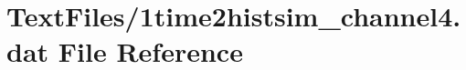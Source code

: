 \hypertarget{1time2histsim__channel4_8dat}{}\section{Text\+Files/1time2histsim\+\_\+channel4.dat File Reference}
\label{1time2histsim__channel4_8dat}
